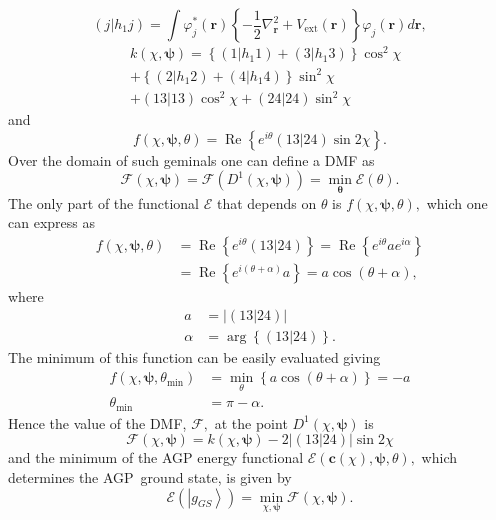 \documentclass[aps,preprint]{revtex4}%
\begin{document}
\[
\left(  j\left\vert h_{1}j\right.  \right)  =\int\varphi_{j}^{\ast}\left(
\boldsymbol{r}\right)  \left\{  -\frac{1}{2}\nabla_{\boldsymbol{r}}%
^{2}+V_{\text{ext}}\left(  \boldsymbol{r}\right)  \right\}  \varphi_{j}\left(
\boldsymbol{r}\right)  d\boldsymbol{r},
\]%
\begin{align*}
&  k\left(  \chi,\boldsymbol{\psi}\right)  =\left\{  \left(  1\left\vert
h_{1}1\right.  \right)  +\left(  3\left\vert h_{1}3\right.  \right)  \right\}
\cos^{2}\chi\\
&  +\left\{  \left(  2\left\vert h_{1}2\right.  \right)  +\left(  4\left\vert
h_{1}4\right.  \right)  \right\}  \sin^{2}\chi\\
&  +\left(  \left.  13\right\vert 13\right)  \cos^{2}\chi+\left(  \left.
24\right\vert 24\right)  \sin^{2}\chi
\end{align*}
and
\[
f\left(  \chi,\boldsymbol{\psi},\theta\right)  =\operatorname{Re}\left\{
e^{i\theta}\left(  \left.  13\right\vert 24\right)  \sin2\chi\right\}  .
\]
Over the domain of such geminals one can define a DMF as
\[
\mathcal{F}\left(  \chi,\boldsymbol{\psi}\right)  =\mathcal{F}\left(
D^{1}\left(  \chi,\boldsymbol{\psi}\right)  \right)  =\min_{\boldsymbol{\theta
}}\mathcal{E}\left(  \theta\right)  .
\]
The only part of the functional $\mathcal{E}$ that depends on $\theta$ is
$f\left(  \chi,\boldsymbol{\psi},\theta\right)  ,$ which one can express as
\begin{align*}
f\left(  \chi,\boldsymbol{\psi},\theta\right)    & =\operatorname{Re}\left\{
e^{i\theta}\left(  \left.  13\right\vert 24\right)  \right\}
=\operatorname{Re}\left\{  e^{i\theta}ae^{i\alpha}\right\}  \\
& =\operatorname{Re}\left\{  e^{i\left(  \theta+\alpha\right)  }a\right\}
=a\cos\left(  \theta+\alpha\right)  ,
\end{align*}
where
\begin{align*}
a &  =\left\vert \left(  \left.  13\right\vert 24\right)  \right\vert \\
\alpha &  =\arg\left\{  \left(  \left.  13\right\vert 24\right)  \right\}  .
\end{align*}
The minimum of this function can be easily evaluated giving
\begin{align*}
f\left(  \chi,\boldsymbol{\psi},\theta_{\min}\right)   &  =\min_{\theta
}\left\{  a\cos\left(  \theta+\alpha\right)  \right\}  =-a\\
\theta_{\min} &  =\pi-\alpha.
\end{align*}
Hence the value of the DMF, $\mathcal{F},$ at the point $D^{1}\left(
\chi,\boldsymbol{\psi}\right)  $ is%
\[
\mathcal{F}\left(  \chi,\boldsymbol{\psi}\right)  =k\left(  \chi
,\boldsymbol{\psi}\right)  -2\left\vert \left(  \left.  13\right\vert
24\right)  \right\vert \sin2\chi
\]
and the minimum of the AGP energy functional $\mathcal{E}\left(
\boldsymbol{c}\left(  \chi\right)  ,\boldsymbol{\psi},\theta\right)  ,$ which
determines the AGP\ ground state, is given by
\[
\mathcal{E}\left(  \left\vert g_{GS}\right\rangle \right)  =\min
_{\chi,\boldsymbol{\psi}}\mathcal{F}\left(  \chi,\boldsymbol{\psi}\right)  .
\]
\end{document}
